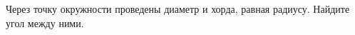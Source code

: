 \begin{ex}
	\begin{condition}
		Через точку окружности проведены диаметр и хорда, равная радиусу. Найдите угол между ними.
	\end{condition}
	\answer{\( 60\degree \)}
\end{ex}